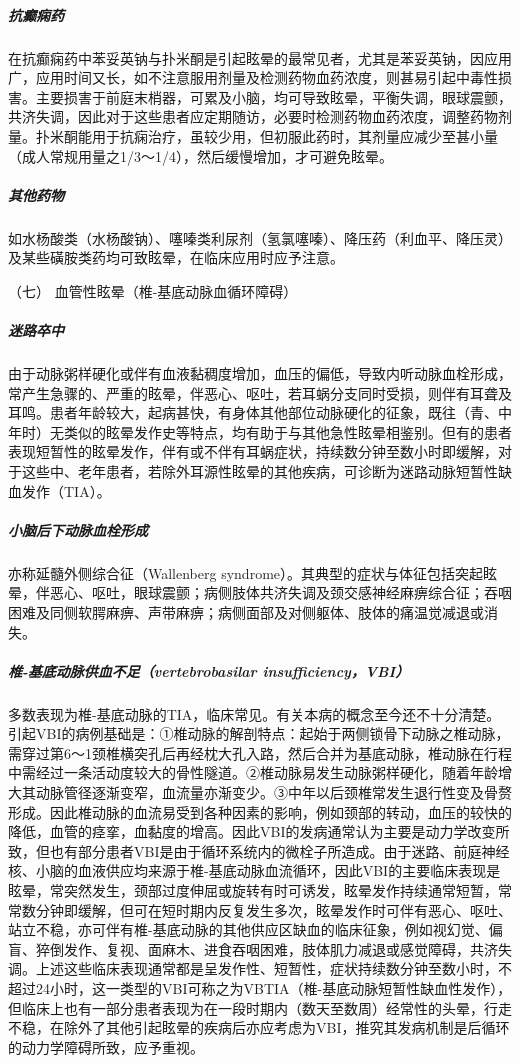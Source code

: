 \subparagraph{抗癫痫药}

在抗癫痫药中苯妥英钠与扑米酮是引起眩晕的最常见者，尤其是苯妥英钠，因应用广，应用时间又长，如不注意服用剂量及检测药物血药浓度，则甚易引起中毒性损害。主要损害于前庭末梢器，可累及小脑，均可导致眩晕，平衡失调，眼球震颤，共济失调，因此对于这些患者应定期随访，必要时检测药物血药浓度，调整药物剂量。扑米酮能用于抗痫治疗，虽较少用，但初服此药时，其剂量应减少至甚小量（成人常规用量之1/3～1/4），然后缓慢增加，才可避免眩晕。

\subparagraph{其他药物}

如水杨酸类（水杨酸钠）、噻嗪类利尿剂（氢氯噻嗪）、降压药（利血平、降压灵）及某些磺胺类药均可致眩晕，在临床应用时应予注意。

\hypertarget{text00012.htmlux5cux23CHP1-3-2-6-7}{}
（七） 血管性眩晕（椎-基底动脉血循环障碍）

\subparagraph{迷路卒中}

由于动脉粥样硬化或伴有血液黏稠度增加，血压的偏低，导致内听动脉血栓形成，常产生急骤的、严重的眩晕，伴恶心、呕吐，若耳蜗分支同时受损，则伴有耳聋及耳鸣。患者年龄较大，起病甚快，有身体其他部位动脉硬化的征象，既往（青、中年时）无类似的眩晕发作史等特点，均有助于与其他急性眩晕相鉴别。但有的患者表现短暂性的眩晕发作，伴有或不伴有耳蜗症状，持续数分钟至数小时即缓解，对于这些中、老年患者，若除外耳源性眩晕的其他疾病，可诊断为迷路动脉短暂性缺血发作（TIA）。

\subparagraph{小脑后下动脉血栓形成}

亦称延髓外侧综合征（Wallenberg
syndrome）。其典型的症状与体征包括突起眩晕，伴恶心、呕吐，眼球震颤；病侧肢体共济失调及颈交感神经麻痹综合征；吞咽困难及同侧软腭麻痹、声带麻痹；病侧面部及对侧躯体、肢体的痛温觉减退或消失。

\subparagraph{椎-基底动脉供血不足（vertebrobasilar insufficiency，VBI）}

多数表现为椎-基底动脉的TIA，临床常见。有关本病的概念至今还不十分清楚。引起VBI的病例基础是：①椎动脉的解剖特点：起始于两侧锁骨下动脉之椎动脉，需穿过第6～1颈椎横突孔后再经枕大孔入路，然后合并为基底动脉，椎动脉在行程中需经过一条活动度较大的骨性隧道。②椎动脉易发生动脉粥样硬化，随着年龄增大其动脉管径逐渐变窄，血流量亦渐变少。③中年以后颈椎常发生退行性变及骨赘形成。因此椎动脉的血流易受到各种因素的影响，例如颈部的转动，血压的较快的降低，血管的痉挛，血黏度的增高。因此VBI的发病通常认为主要是动力学改变所致，但也有部分患者VBI是由于循环系统内的微栓子所造成。由于迷路、前庭神经核、小脑的血液供应均来源于椎-基底动脉血流循环，因此VBI的主要临床表现是眩晕，常突然发生，颈部过度伸屈或旋转有时可诱发，眩晕发作持续通常短暂，常常数分钟即缓解，但可在短时期内反复发生多次，眩晕发作时可伴有恶心、呕吐、站立不稳，亦可伴有椎-基底动脉的其他供应区缺血的临床征象，例如视幻觉、偏盲、猝倒发作、复视、面麻木、进食吞咽困难，肢体肌力减退或感觉障碍，共济失调。上述这些临床表现通常都是呈发作性、短暂性，症状持续数分钟至数小时，不超过24小时，这一类型的VBI可称之为VBTIA（椎-基底动脉短暂性缺血性发作），但临床上也有一部分患者表现为在一段时期内（数天至数周）经常性的头晕，行走不稳，在除外了其他引起眩晕的疾病后亦应考虑为VBI，推究其发病机制是后循环的动力学障碍所致，应予重视。


